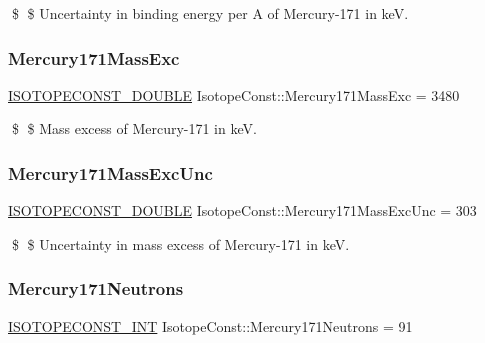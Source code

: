 \$ \$ Uncertainty in binding energy per A of Mercury-\/171 in keV. \mbox{\label{group___isotope_const-_mercury-_hg171_ga7939b3984557d5068cc07782461bcd7f}} 
\subsubsection{\texorpdfstring{Mercury171\+Mass\+Exc}{Mercury171MassExc}}
{\footnotesize\ttfamily \mbox{\hyperlink{group___isotope_const-_macros_ga8f45a7272ce02c0b4c65c44636ed719a}{I\+S\+O\+T\+O\+P\+E\+C\+O\+N\+S\+T\+\_\+\+D\+O\+U\+B\+LE}} Isotope\+Const\+::\+Mercury171\+Mass\+Exc = 3480}

\$ \$ Mass excess of Mercury-\/171 in keV. \mbox{\label{group___isotope_const-_mercury-_hg171_ga0290113c34daad1b32880ee0541fd103}} 
\subsubsection{\texorpdfstring{Mercury171\+Mass\+Exc\+Unc}{Mercury171MassExcUnc}}
{\footnotesize\ttfamily \mbox{\hyperlink{group___isotope_const-_macros_ga8f45a7272ce02c0b4c65c44636ed719a}{I\+S\+O\+T\+O\+P\+E\+C\+O\+N\+S\+T\+\_\+\+D\+O\+U\+B\+LE}} Isotope\+Const\+::\+Mercury171\+Mass\+Exc\+Unc = 303}

\$ \$ Uncertainty in mass excess of Mercury-\/171 in keV. \mbox{\label{group___isotope_const-_mercury-_hg171_ga8ca9eb58ac913a859ecb2240cea53a12}} 
\subsubsection{\texorpdfstring{Mercury171\+Neutrons}{Mercury171Neutrons}}
{\footnotesize\ttfamily \mbox{\hyperlink{group___isotope_const-_macros_ga5f18360b3e99483a35c32d789e62621c}{I\+S\+O\+T\+O\+P\+E\+C\+O\+N\+S\+T\+\_\+\+I\+NT}} Isotope\+Const\+::\+Mercury171\+Neutrons = 91}

